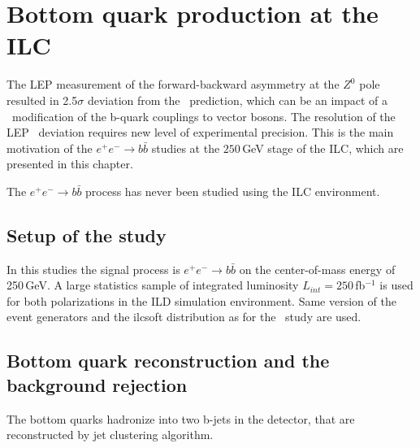 \newpage
\section{Bottom quark production at the ILC}
\label{sec:BProduction}
The LEP measurement of the forward-backward asymmetry at the $Z^0$ pole resulted in 2.5$\sigma$ deviation from the \sm\ prediction, which can be an impact of a \bsm\ modification of the b-quark couplings to vector bosons.
The resolution of the LEP \afbb\ deviation requires new level of experimental precision.
This is the main motivation of the $e^+e^-\to b\bar{b}$ studies at the $250$\,GeV stage of the ILC, which are presented in this chapter. 

The $e^+e^-\to b\bar{b}$ process has never been studied using the ILC environment. 
\subsection{Setup of the study}
In this studies the signal process is $e^+e^-\to b\bar{b}$ on the center-of-mass energy of 250\,GeV. 
A large statistics sample of integrated luminosity $L_{int}= 250$\,fb{$^{-1}$} is used for both polarizations in the ILD simulation environment. 
Same version of the event generators and the {\sc ilcsoft} distribution as for the \ttbar\ study are used.


\subsection{Bottom quark reconstruction and the background rejection}
The bottom quarks hadronize into two b-jets in the detector, that are reconstructed by jet clustering algorithm. %

